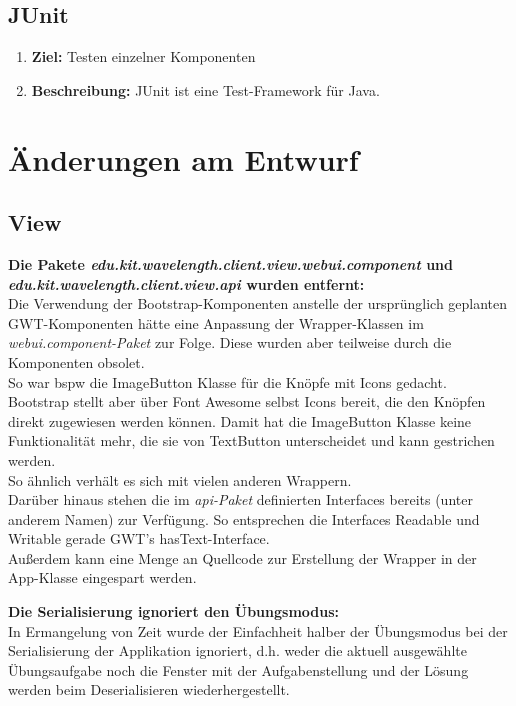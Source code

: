 \documentclass[parskip=full,11pt,twoside]{scrartcl}
\begin{document}
\subsection{JUnit}
\begin{enumerate}
\item[] \textbf{Ziel:} Testen einzelner Komponenten
\item[] \textbf{Beschreibung:} JUnit ist eine Test-Framework für Java.
\end{enumerate}

\section{Änderungen am Entwurf}

\subsection{View}
\textbf{Die Pakete \emph{edu.kit.wavelength.client.view.webui.component} und \emph{edu.kit.wavelength.client.view.api} wurden entfernt:} \\
Die Verwendung der Bootstrap-Komponenten anstelle der ursprünglich geplanten GWT-Komponenten hätte eine Anpassung der Wrapper-Klassen im \emph{webui.component-Paket} zur Folge.
Diese wurden aber teilweise durch die Komponenten obsolet. \\
So war bspw die ImageButton Klasse für die Knöpfe mit Icons gedacht.
Bootstrap stellt aber über Font Awesome selbst Icons bereit, die den Knöpfen direkt zugewiesen werden können.
Damit hat die ImageButton Klasse keine Funktionalität mehr, die sie von TextButton unterscheidet und kann gestrichen werden. \\
So ähnlich verhält es sich mit vielen anderen Wrappern.\\
Darüber hinaus stehen die im \emph{api-Paket} definierten Interfaces bereits (unter anderem Namen) zur Verfügung.
So entsprechen die Interfaces Readable und Writable gerade GWT's hasText-Interface.\\	
Außerdem kann eine Menge an Quellcode zur Erstellung der Wrapper in der App-Klasse eingespart werden.

\textbf{Die Serialisierung ignoriert den Übungsmodus:} \\
In Ermangelung von Zeit wurde der Einfachheit halber der Übungsmodus bei der Serialisierung der Applikation ignoriert, d.h. 
 weder die aktuell ausgewählte Übungsaufgabe noch die Fenster mit der Aufgabenstellung und der Lösung werden beim 
 Deserialisieren wiederhergestellt.
\end{document}
